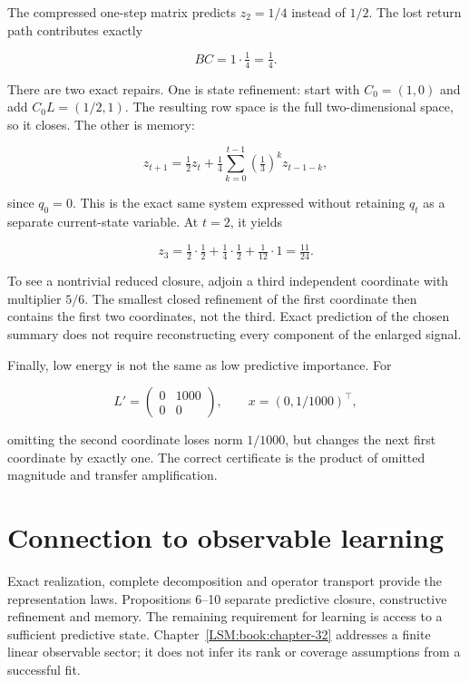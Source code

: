The compressed one-step matrix predicts \(z_2=1/4\) instead of \(1/2\).
The lost return path contributes exactly

\[
BC=1\cdot\tfrac14=\tfrac14.
\]

There are two exact repairs. One is state refinement: start with
\(C_0=(1,0)\) and add \(C_0L=(1/2,1)\). The resulting row space is the
full two-dimensional space, so it closes. The other is memory:

\[
z_{t+1}=\tfrac12z_t+
\tfrac14\sum_{k=0}^{t-1}\left(\tfrac13\right)^kz_{t-1-k},
\]

since \(q_0=0\). This is the exact same system expressed without
retaining \(q_t\) as a separate current-state variable. At \(t=2\), it
yields

\[
z_3=\tfrac12\cdot\tfrac12
+\tfrac14\cdot\tfrac12
+\tfrac1{12}\cdot1
=\tfrac{11}{24}.
\]

To see a nontrivial reduced closure, adjoin a third independent
coordinate with multiplier \(5/6\). The smallest closed refinement of
the first coordinate then contains the first two coordinates, not the
third. Exact prediction of the chosen summary does not require
reconstructing every component of the enlarged signal.

Finally, low energy is not the same as low predictive importance. For

\[
L'=\begin{pmatrix}0&1000\\0&0\end{pmatrix},
\qquad x=(0,1/1000)^\top,
\]

omitting the second coordinate loses norm \(1/1000\), but changes the
next first coordinate by exactly one. The correct certificate is the
product of omitted magnitude and transfer amplification.

\section{Connection to observable learning}\label{LSM:connection-to-observable-learning}

Exact realization, complete decomposition and operator transport provide
the representation laws. Propositions 6--10 separate predictive closure,
constructive refinement and memory. The remaining requirement for
learning is access to a sufficient predictive state. Chapter~\ref{LSM:book:chapter-32} addresses a
finite linear observable sector; it does not infer its rank or coverage
assumptions from a successful fit.


